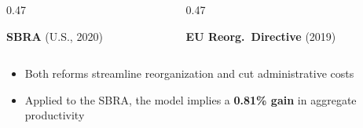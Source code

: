 \documentclass[aspectratio=169,xcolor=table]{beamer}
\begin{document}
\begin{frame}[label=conclusions2]
\begin{columns}[T,onlytextwidth]
\begin{column}{0.47\textwidth}
\begin{tcolorbox}[colback=lightblue,colframe=primary,boxrule=1pt,arc=1.5mm,left=2mm,right=2mm,top=0.8mm,bottom=0.8mm,halign=center]
\small \textbf{\textcolor{primary}{SBRA}} (U.S., 2020)
\end{tcolorbox}
\end{column}
\begin{column}{0.47\textwidth}
\begin{tcolorbox}[colback=lightblue,colframe=primary,boxrule=1pt,arc=1.5mm,left=2mm,right=2mm,top=0.8mm,bottom=0.8mm,halign=center]
\small \textbf{\textcolor{primary}{EU Reorg.\ Directive}} (2019)
\end{tcolorbox}
\end{column}
\end{columns}   \vspace{3mm}
\begin{itemize}
    \item Both reforms streamline reorganization and cut administrative costs
    \item Applied to the SBRA, the model implies a \textbf{\textcolor{primary}{0.81\% gain}} in aggregate productivity
\end{itemize} \normalsize
 
\end{frame}




\appendix
\end{document}
